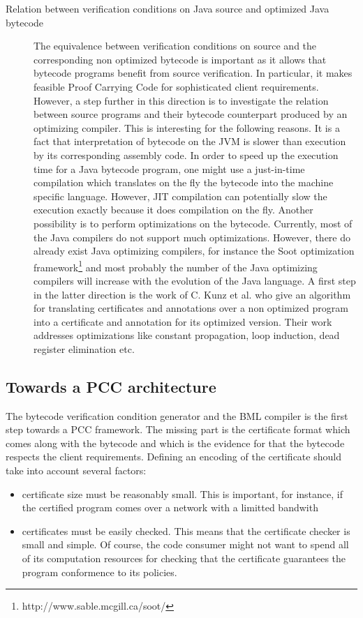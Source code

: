 \begin{description}
\item[Relation between verification conditions on Java source and optimized Java bytecode]
 The equivalence  between verification conditions on source and the corresponding non optimized bytecode is important as it
 allows that bytecode programs  benefit from source verification. In particular, it makes feasible Proof Carrying Code
 for sophisticated client requirements.
 However, a step further in this direction is to investigate the 
 relation between source programs and their bytecode counterpart produced by an optimizing compiler.
 This is interesting for the following reasons.
 It is a fact that interpretation of bytecode on the JVM is slower than execution by its corresponding assembly code. 
 In order to speed up the execution time for a Java bytecode program, one might use 
 a just-in-time compilation which  translates on the fly the bytecode into the machine specific language. However, JIT compilation can potentially slow
 the execution exactly because it does compilation on the fly.  Another possibility is to perform 
 optimizations on the bytecode. Currently, most of the  Java compilers do not support much optimizations.
 However, there do already exist Java optimizing compilers, for instance the Soot optimization framework\footnote{http://www.sable.mcgill.ca/soot/} 
 and most probably the number of the Java optimizing compilers will increase with the evolution of the Java language.
 A first step in the latter direction is the work of C. Kunz et al.\cite{BGKRsas06} who give an algorithm for translating 
 certificates and annotations over a non optimized program into a certificate  and annotation for its optimized version.
 Their work addresses  optimizations like constant propagation, loop induction, dead register elimination etc. 
\end{description}
\subsection{Towards a PCC architecture}

The bytecode verification condition generator and the BML compiler is the first step towards a PCC framework. 
The missing  part is  the certificate format which comes along with the bytecode and which  is the evidence for 
that the bytecode respects the client requirements. Defining an encoding of the certificate should take into account several factors:
\begin{itemize} 
  \item certificate size must be reasonably small. This is important, for instance,  if the certified program comes over a network with a limitted bandwith
  \item certificates must be easily checked. This means that the certificate checker is  small and simple.
	       Of course, the code consumer might not want to spend all of its computation 
	      resources for checking that the certificate guarantees the program conformence to its policies.     
\end{itemize}

